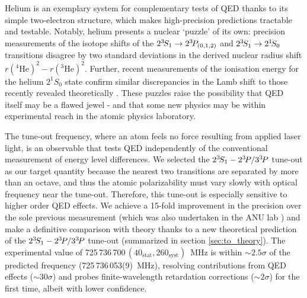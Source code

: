 	Helium is an exemplary system for complementary tests of QED thanks to its simple two-electron structure, which makes high-precision predictions tractable and testable. 
	Notably, helium presents a nuclear `puzzle' of its own: precision measurements of the isotope shifts of the \(2^{3\!}S_1 \rightarrow 2^{3\!}P_{(0,1,2)} \) \cite{Zheng17} and \(2^{3\!}S_1 \rightarrow 2^{1\!}S_0 \) \cite{Rengelink18} transitions disagree by two standard deviations in the derived nuclear radius shift $r(^4\textrm{He})^2-r(^3\textrm{He})^2$. 
	Further, recent measurements of the ionisation energy for the helium $2^{1\!}S_0$ state \cite{Clausen21} confirm similar discrepancies in the Lamb shift to those recently revealed theoretically \cite{Patkos21}.
	These puzzles raise the possibility that QED itself may be a flawed jewel \cite{Hill17} - and that some new physics may be within experimental reach in the atomic physics laboratory. 

	The tune-out frequency, where an atom feels no force resulting from applied laser light, is an observable that tests QED independently of the conventional measurement of energy level differences.
	We selected the $2^{3\!}S_1-2^{3\!} P/3^{3\!} P$ tune-out as our target quantity because the nearest two transitions are separated by more than an octave, and thus the atomic polarizability must vary slowly with optical frequency near the tune-out. 
	Therefore, this tune-out is especially sensitive to higher order QED effects. 
	We achieve a 15-fold improvement in the precision over the sole previous measurement (which was also undertaken in the ANU \mhe lab \cite{Henson15}) and make a definitive comparison with theory thanks to a new theoretical prediction of the \(2^{3\!}S_1- 2^{3\!}P / 3^{3\!}P\) tune-out (summarized in section \ref{sec:to_theory}).
	The experimental value of 725\,736\,700\,$(40_{\mathrm{stat}},260_{\mathrm{syst}})$~MHz is within \({\sim} 2.5\sigma\) of the predicted frequency (725\,736\,053(9)~MHz),   resolving contributions from QED effects (\({\sim} 30 \sigma\)) and probes finite-wavelength retardation corrections (\({\sim} 2 \sigma\)) for the first time, albeit with lower confidence.


